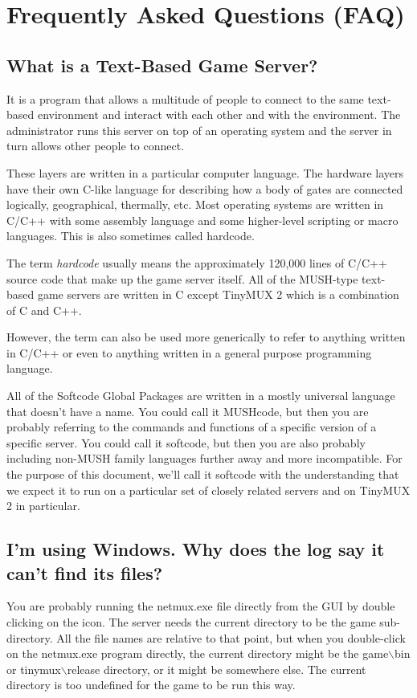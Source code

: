 \documentclass[10pt,letterpaper]{book}
\begin{document}
\section{Frequently Asked Questions (FAQ)}
\subsection{What is a Text-Based Game Server?}
It is a program that allows a multitude of people to connect to the same
text-based environment and interact with each other and with the environment.
The administrator runs this server on top of an operating system and the server
in turn allows other people to connect. %

These layers are written in a particular computer language. The hardware
layers have their own C-like language for describing how a body of gates are
connected logically, geographical, thermally, etc.  Most operating systems are
written in C/C++ with some assembly language and some higher-level scripting
or macro languages. This is also sometimes called hardcode.

The term \emph{hardcode} usually means the approximately 120,000 lines of C/C++
source code that make up the game server itself.
All of the MUSH-type text-based game servers are written in C except
TinyMUX 2 which is a combination of C and C++.

However, the term can also be used more generically to refer to anything
written in C/C++ or even to anything written in a general purpose programming
language.

All of the Softcode Global Packages are written in a mostly universal language
that doesn't have a name. You could call it MUSHcode, but then you are probably
referring to the commands and functions of a specific version of a specific
server. You could call
it softcode, but then you are also probably including non-MUSH family languages
further away and more incompatible. For the purpose of this document, we'll
call it softcode with the understanding that we expect it to run on a particular
set of closely related servers and on TinyMUX 2 in particular.

\subsection{I'm using Windows. Why does the log say it can't find its files?}
You are probably running the netmux.exe file directly from the GUI by double
clicking on the icon. The server needs the current directory to be the game
sub-directory. All the file names are relative to that point, but when you
double-click on the netmux.exe program directly, the current directory might
be the game$\backslash$bin or tinymux$\backslash$release directory, or it
might be somewhere else.  The current directory is too undefined for the game
to be run this way.
\end{document}

